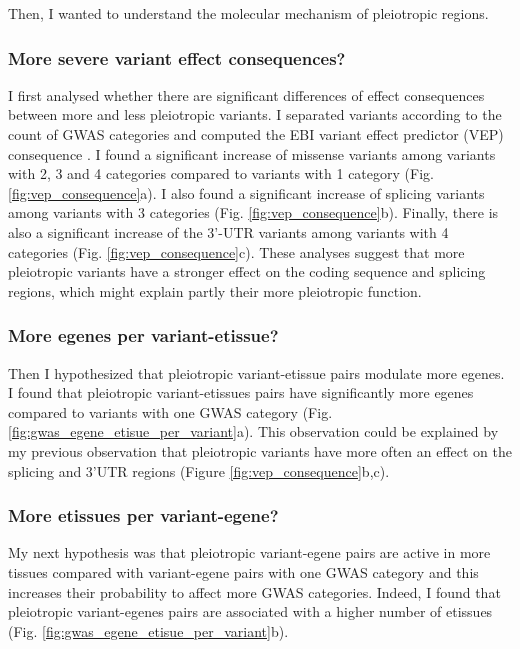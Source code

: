 Then, I wanted to understand the molecular mechanism of pleiotropic regions.

\subsubsection*{More severe variant effect consequences?}

I first analysed whether there are significant differences of effect consequences between more and less pleiotropic variants.
%
I separated variants according to the count of GWAS categories and computed the EBI variant effect predictor (VEP) consequence \citep{2016.Cunningham.McLaren}.
%
I found a significant increase of missense variants among variants with 2, 3 and 4 categories compared to variants with 1 category (Fig. \ref{fig:vep_consequence}a).
%
I also found a significant increase of splicing variants among variants with 3 categories (Fig. \ref{fig:vep_consequence}b).
%
Finally, there is also a significant increase of the 3'-UTR variants among variants with 4 categories (Fig. \ref{fig:vep_consequence}c).
%
These analyses suggest that more pleiotropic variants have a stronger effect on the coding sequence and splicing regions, which might explain partly their more pleiotropic function.

\subsubsection*{More egenes per variant-etissue?}

Then I hypothesized that pleiotropic variant-etissue pairs modulate more egenes.
%
I found that pleiotropic variant-etissues pairs have significantly more egenes compared to variants with one GWAS category (Fig. \ref{fig:gwas_egene_etisue_per_variant}a).
%
This observation could be explained by my previous observation that pleiotropic variants have more often an effect on the splicing and 3'UTR regions (Figure \ref{fig:vep_consequence}b,c).

\subsubsection*{More etissues per variant-egene?}

My next hypothesis was that pleiotropic variant-egene pairs are active in more tissues compared with variant-egene pairs with one GWAS category and this increases their probability to affect more GWAS categories.
%
Indeed, I found that pleiotropic variant-egenes pairs are associated with a higher number of etissues (Fig. \ref{fig:gwas_egene_etisue_per_variant}b).

